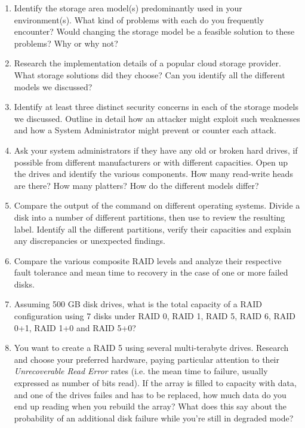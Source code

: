 \begin{enumerate}

\item
Identify the storage area model(s) predominantly used in your
environment(s).  What kind of problems with each do you frequently
encounter?  Would changing the storage model be a feasible solution to
these problems?  Why or why not?

\item
Research the implementation details of a popular cloud storage provider.
What storage solutions did they choose?  Can you identify all the
different models we discussed?

\item
Identify at least three distinct security concerns in each of the storage
models we discussed.  Outline in detail how an attacker might exploit such
weaknesses and how a System Administrator might prevent or counter each
attack.

\item
\label{prob:disks:hdds}
Ask your system administrators if they have any old or broken hard drives,
if possible from different manufacturers or with different capacities.
Open up the drives and identify the various components.  How many
read-write heads are there?  How many platters?  How do the different
models differ?

\item
\label{prob:disks:disklabel}
Compare the output of the  command on different operating
systems.  Divide a disk into a number of different partitions, then use
 to review the resulting label.  Identify all the
different partitions, verify their capacities and explain any
discrepancies or unexpected findings.

\item
Compare the various composite RAID levels and analyze their respective
fault tolerance and mean time to recovery in the case of one or more
failed disks.

\item
Assuming 500 GB disk drives, what is the total capacity of a RAID
configuration using 7 disks under RAID 0, RAID 1, RAID 5, RAID 6, RAID
0+1, RAID 1+0 and RAID 5+0?

\item
You want to create a RAID 5 using several multi-terabyte
drives.  Research and choose your preferred hardware,
paying particular attention to their {\em
Unrecoverable Read Error} rates (i.e. the mean time to failure, usually
expressed as number of bits read).  If the array is
filled to capacity with data, and one of the drives
failes and has to be replaced, how much data do you
end up reading when you rebuild the array?  What does
this say about the probability of an additional disk
failure while you're still in degraded mode?


\end{enumerate}
